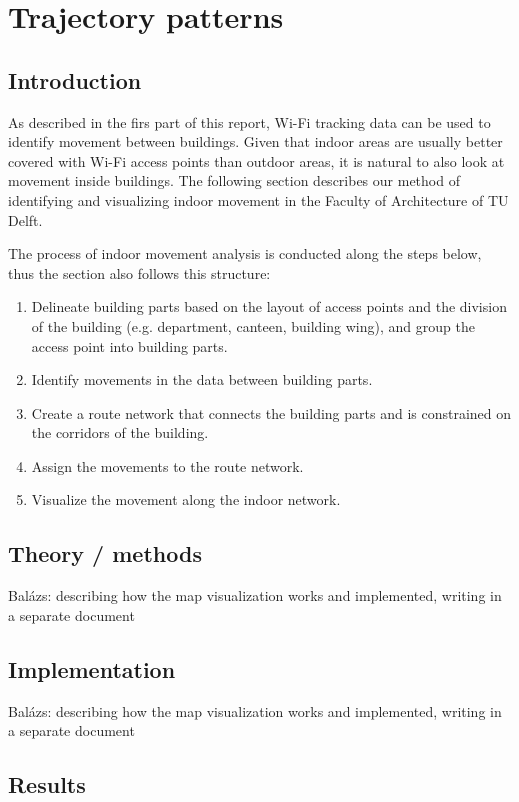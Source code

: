 \chapter{Trajectory patterns}
\section{Introduction}
As described in the firs part of this report, Wi-Fi tracking data can be used to
identify movement between buildings. Given that indoor areas are usually better
covered with Wi-Fi access points than outdoor areas, it is natural to also look
at movement inside buildings. The following section describes our method of
identifying and visualizing indoor movement in the Faculty of Architecture of TU
Delft.

The process of indoor movement analysis is conducted along the steps below,
thus the section also follows this structure:

\begin{enumerate}
    \item Delineate building parts based on the layout of access points
and the division of the building (e.g. department, canteen, building wing), and
group the access point into building parts.
    \item Identify movements in the data between building parts.
    \item Create a route network that connects the building parts and
    is constrained on the corridors of the building.
    \item Assign the movements to the route network.
    \item Visualize the movement along the indoor network.
\end{enumerate}

\section{Theory / methods}
Balázs: describing how the map visualization works and implemented, writing in 
a separate document
\section{Implementation}
Balázs: describing how the map visualization works and implemented, writing in 
a separate document
\section{Results}

